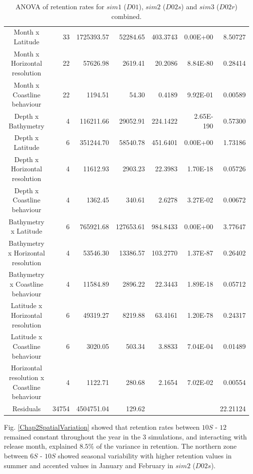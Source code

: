 \begin{table}[H]
\begin{adjustbox}{width=1.2\textwidth}
\begin{tabular}{c|r|r|r|r|r|r}
Month x Latitude                 & 33 & 1725393.57 & 52284.65   & 403.3743   & 0.00E+00  & 8.50727  \\
Month x Horizontal resolution    & 22 & 57626.98   & 2619.41    & 20.2086    & 8.84E-80  & 0.28414  \\
Month x Coastline behaviour      & 22 & 1194.51    & 54.30      & 0.4189     & 9.92E-01  & 0.00589  \\
Depth x Bathymetry               & 4  & 116211.66  & 29052.91   & 224.1422   & 2.65E-190 & 0.57300  \\
Depth x Latitude                 & 6  & 351244.70  & 58540.78   & 451.6401   & 0.00E+00  & 1.73186  \\
Depth x Horizontal resolution    & 4  & 11612.93   & 2903.23    & 22.3983    & 1.70E-18  & 0.05726  \\
Depth x Coastline behaviour      & 4  & 1362.45    & 340.61     & 2.6278     & 3.27E-02  & 0.00672  \\
Bathymetry x Latitude            & 6  & 765921.68  & 127653.61  & 984.8433   & 0.00E+00  & 3.77647  \\
Bathymetry x Horizontal resolution & 4 & 53546.30 & 13386.57 & 103.2770 & 1.37E-87 & 0.26402 \\
Bathymetry x Coastline behaviour   & 4 & 11584.89   & 2896.22    & 22.3443    & 1.89E-18  & 0.05712  \\
Latitude x Horizontal resolution   & 6 & 49319.27   & 8219.88    & 63.4161    & 1.20E-78  & 0.24317  \\
Latitude x Coastline behaviour     & 6 & 3020.05    & 503.34     & 3.8833     & 7.04E-04  & 0.01489  \\
Horizontal resolution x Coastline   behaviour & 4 & 1122.71  & 280.68   & 2.1654   & 7.02E-02 & 0.00554 \\
Residuals                        & 34754 & 4504751.04 & 129.62     &        &           & 22.21124\\
\hline
\end{tabular}
\end{adjustbox}
\caption{ANOVA of retention rates for $sim 1$ ($D01$), $sim 2$ ($D02s$) and $sim 3$ ($D02r$) combined.}
\label{TabAnovaSimus}
\end{table}

Fig. \ref{Chap2SpatialVariation} showed that retention rates between $10$\textdegree $S$ - $12$ remained constant throughout the year in the 3 simulations, and interacting with release month, explained $8.5\%$ of the variance in retention. The northern zone between $6$\textdegree $S$ - $10$\textdegree $S$ showed seasonal variability with higher retention values in summer and accented values in January and February in $sim 2$ ($D02s$).\\

